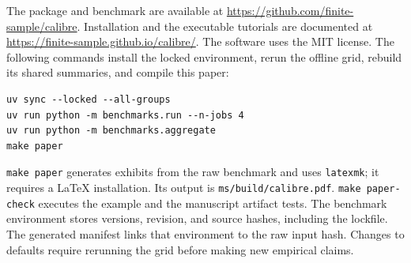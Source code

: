 \documentclass[11pt]{article}
\begin{document}
The package and benchmark are available at \url{https://github.com/finite-sample/calibre}. Installation and the executable tutorials are documented at \url{https://finite-sample.github.io/calibre/}. The software uses the MIT license. The following commands install the locked environment, rerun the offline grid, rebuild its shared summaries, and compile this paper:
\begin{lstlisting}
uv sync --locked --all-groups
uv run python -m benchmarks.run --n-jobs 4
uv run python -m benchmarks.aggregate
make paper
\end{lstlisting}
\texttt{make paper} generates exhibits from the raw benchmark and uses \texttt{latexmk}; it requires a LaTeX installation. Its output is \texttt{ms/build/calibre.pdf}. \texttt{make paper-check} executes the example and the manuscript artifact tests. The benchmark environment stores versions, revision, and source hashes, including the lockfile. The generated manifest links that environment to the raw input hash. Changes to defaults require rerunning the grid before making new empirical claims.



\end{document}
